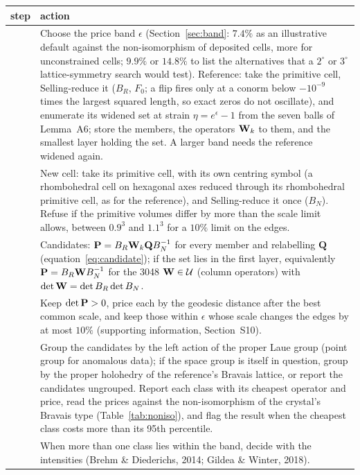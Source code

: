 \begin{widetable}
\caption{Reindexing a new cell against a reference within a price band $\epsilon$.}
\label{tab:algorithm}
\begin{footnotesize}
\begin{tabular}{>{\raggedright\arraybackslash}p{0.6cm}>{\raggedright\arraybackslash}p{16.6cm}}
\toprule
step & action \\
\midrule
1 & Choose the price band $\epsilon$ (Section~\ref{sec:band}: $7.4\%$ as an illustrative default against the non-isomorphism of deposited cells, more for unconstrained cells; $9.9\%$ or $14.8\%$ to list the alternatives that a $2^\circ$ or $3^\circ$ lattice-symmetry search would test). Reference: take the primitive cell, Selling-reduce it ($B_R$, $F_0$; a flip fires only at a conorm below $-10^{-9}$ times the largest squared length, so exact zeros do not oscillate), and enumerate its widened set at strain $\eta=e^\epsilon-1$ from the seven balls of Lemma~A6; store the members, the operators $\Wop_k$ to them, and the smallest layer holding the set. A larger band needs the reference widened again. \\
2 & New cell: take its primitive cell, with its own centring symbol (a rhombohedral cell on hexagonal axes reduced through its rhombohedral primitive cell, as for the reference), and Selling-reduce it once ($B_N$). Refuse if the primitive volumes differ by more than the scale limit allows, between $0.9^3$ and $1.1^3$ for a $10\%$ limit on the edges. \\
3 & Candidates: $\Pop=B_R\Wop_k\mathbf QB_N^{-1}$ for every member and relabelling $\mathbf Q$ (equation~\ref{eq:candidate}); if the set lies in the first layer, equivalently $\Pop=B_R\Wop B_N^{-1}$ for the 3048 $\Wop\in\mathcal U$ (column operators) with $\det\Wop=\det B_R\det B_N$. \\
4 & Keep $\det\Pop>0$, price each by the geodesic distance after the best common scale, and keep those within $\epsilon$ whose scale changes the edges by at most $10\%$ (supporting information, Section~S10). \\
5 & Group the candidates by the left action of the proper Laue group (point group for anomalous data); if the space group is itself in question, group by the proper holohedry of the reference's Bravais lattice, or report the candidates ungrouped. Report each class with its cheapest operator and price, read the prices against the non-isomorphism of the crystal's Bravais type (Table~\ref{tab:noniso}), and flag the result when the cheapest class costs more than its 95th percentile. \\
6 & When more than one class lies within the band, decide with the intensities (Brehm \& Diederichs, 2014; Gildea \& Winter, 2018). \\
\bottomrule
\end{tabular}
\end{footnotesize}
\end{widetable}

